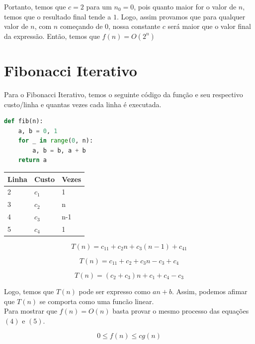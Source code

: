 \documentclass[a4paper, 12pt]{article}
\begin{document}
Portanto, temos que $c=2$ para um $n_0=0$, pois quanto maior for o valor de $n$, temos que o resultado final tende a $1$. Logo, assim provamos que para qualquer valor de $n$, com $n$ começando de $0$, nossa constante $c$ será maior que o valor final da expressão. Então, temos que $f(n)=O(2^n)$

\newpage 
\section{Fibonacci Iterativo}

Para o Fibonacci Iterativo, temos o seguinte código da função e seu respectivo custo/linha e quantas vezes cada linha é executada.

\begin{lstlisting}[language=Python, caption= Código da função do Fibonacci Iterativo]
def fib(n):
    a, b = 0, 1
    for _ in range(0, n):
        a, b = b, a + b
    return a
\end{lstlisting}

\begin{center}
\begin{tabular}{|l|l|l|}
\hline
{\bf Linha} & {\bf Custo} & {\bf Vezes}\\
\hline
2 & $c_1$ & 1\\
\hline
3 & $c_2$ & n\\
\hline
4 & $c_3$ & n-1\\
\hline
5 & $c_4$ & 1\\
\hline
\end{tabular}
\end{center}

\begin{equation}
T(n) = c_11+c_2n+c_3(n-1)+c_41
\end{equation}

\begin{equation}
T(n) = c_11+c_2+c_3n-c_3+c_4
\end{equation}

\begin{equation}
T(n) = (c_2+c_3)n+c_1+c_4-c_3
\end{equation}

Logo, temos que $T(n)$ pode ser expresso como $an+b$. Assim, podemos afimar que $T(n)$ se comporta como uma funcão linear.\\

Para mostrar que $f(n)=O(n)$ basta provar o mesmo processo das equações $(4)$ e $(5)$.

\begin{equation}
0 \leq f(n) \leq cg(n)
\end{equation}
\end{document}
